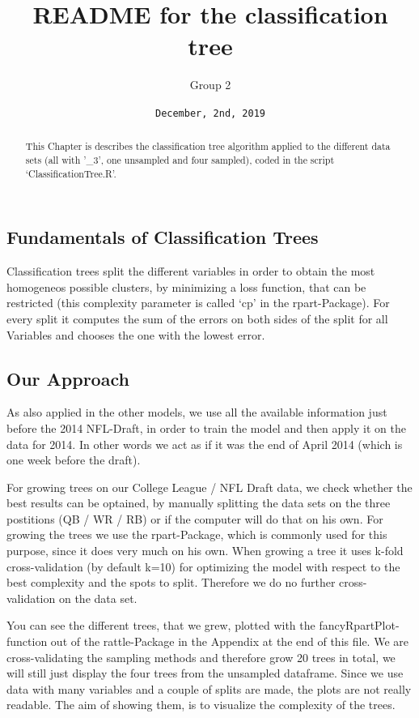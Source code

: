 \documentclass[]{article}
\title{README for the classification tree}
\author{Group 2}
\date{\texttt{December,\ 2nd,\ 2019}}
\begin{document}
\maketitle
\begin{abstract}
This Chapter is describes the classification tree algorithm applied to
the different data sets (all with '\_3', one unsampled and four
sampled), coded in the script `ClassificationTree.R'.
\end{abstract}

\hypertarget{fundamentals-of-classification-trees}{%
\subsection{Fundamentals of Classification
Trees}\label{fundamentals-of-classification-trees}}

Classification trees split the different variables in order to obtain
the most homogeneos possible clusters, by minimizing a loss function,
that can be restricted (this complexity parameter is called `cp' in the
rpart-Package). For every split it computes the sum of the errors on
both sides of the split for all Variables and chooses the one with the
lowest error.

\hypertarget{our-approach}{%
\subsection{Our Approach}\label{our-approach}}

As also applied in the other models, we use all the available
information just before the 2014 NFL-Draft, in order to train the model
and then apply it on the data for 2014. In other words we act as if it
was the end of April 2014 (which is one week before the draft).

For growing trees on our College League / NFL Draft data, we check
whether the best results can be optained, by manually splitting the data
sets on the three postitions (QB / WR / RB) or if the computer will do
that on his own. For growing the trees we use the rpart-Package, which
is commonly used for this purpose, since it does very much on his own.
When growing a tree it uses k-fold cross-validation (by default k=10)
for optimizing the model with respect to the best complexity and the
spots to split. Therefore we do no further cross-validation on the data
set.

You can see the different trees, that we grew, plotted with the
fancyRpartPlot-function out of the rattle-Package in the Appendix at the
end of this file. We are cross-validating the sampling methods and
therefore grow 20 trees in total, we will still just display the four
trees from the unsampled dataframe. Since we use data with many
variables and a couple of splits are made, the plots are not really
readable. The aim of showing them, is to visualize the complexity of the
trees.
\end{document}
